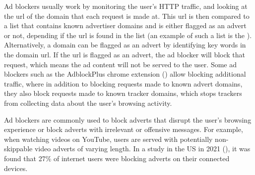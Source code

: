 \documentclass{l4proj}
\begin{document}
Ad blockers usually work by monitoring the user's HTTP traffic, and looking at the url of the domain that each request is made at. This url is then compared to a list that contains known advertiser domains and is either flagged as an advert or not, depending if the url is found in the list (an example of such a list is the \cite{easylist}). Alternatively, a domain can be flagged as an advert by identifying key words in the domain url. If the url is flagged as an advert, the ad blocker will block that request, which means the ad content will not be served to the user. Some ad blockers such as the AdblockPlus chrome extension (\cite{adblock}) allow blocking additional traffic, where in addition to blocking requests made to known advert domains, they also block requests made to known tracker domains, which stops trackers from collecting data about the user's browsing activity.

Ad blockers are commonly used to block adverts that disrupt the user's browsing experience or block adverts with irrelevant or offensive messages. For example, when watching videos on YouTube, users are served with potentially non-skippable video adverts of varying length. In a study in the US in 2021 (\cite{stats}), it was found that 27\% of internet users were blocking adverts on their connected devices. 

\end{document}
